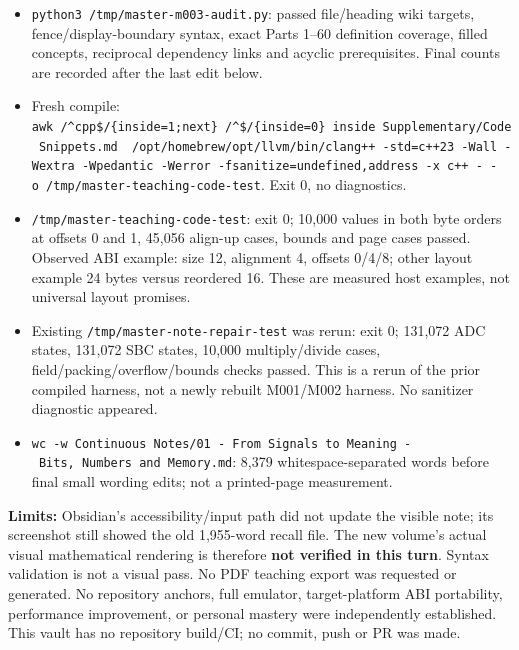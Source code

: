 \begin{itemize}
\tightlist
\item
  \texttt{python3\ /tmp/master-m003-audit.py}: passed file/heading wiki targets, fence/display-boundary syntax, exact Parts 1--60 definition coverage, filled concepts, reciprocal dependency links and acyclic prerequisites. Final counts are recorded after the last edit below.
\item
  Fresh compile: \texttt{awk\ \textquotesingle{}/\^{}\textasciigrave{}\textasciigrave{}\textasciigrave{}cpp\$/\{inside=1;next\}\ /\^{}\textasciigrave{}\textasciigrave{}\textasciigrave{}\$/\{inside=0\}\ inside\textquotesingle{}\ \textquotesingle{}Supplementary/Code\ Snippets.md\textquotesingle{}\ \textbar{}\ /opt/homebrew/opt/llvm/bin/clang++\ -std=c++23\ -Wall\ -Wextra\ -Wpedantic\ -Werror\ -fsanitize=undefined,address\ -x\ c++\ -\ -o\ /tmp/master-teaching-code-test}. Exit 0, no diagnostics.
\item
  \texttt{/tmp/master-teaching-code-test}: exit 0; 10,000 values in both byte orders at offsets 0 and 1, 45,056 align-up cases, bounds and page cases passed. Observed ABI example: size 12, alignment 4, offsets 0/4/8; other layout example 24 bytes versus reordered 16. These are measured host examples, not universal layout promises.
\item
  Existing \texttt{/tmp/master-note-repair-test} was rerun: exit 0; 131,072 ADC states, 131,072 SBC states, 10,000 multiply/divide cases, field/packing/overflow/bounds checks passed. This is a rerun of the prior compiled harness, not a newly rebuilt M001/M002 harness. No sanitizer diagnostic appeared.
\item
  \texttt{wc\ -w\ \textquotesingle{}Continuous\ Notes/01\ -\ From\ Signals\ to\ Meaning\ -\ Bits,\ Numbers\ and\ Memory.md\textquotesingle{}}: 8,379 whitespace-separated words before final small wording edits; not a printed-page measurement.
\end{itemize}

\textbf{Limits:} Obsidian's accessibility/input path did not update the visible note; its screenshot still showed the old 1,955-word recall file. The new volume's actual visual mathematical rendering is therefore \textbf{not verified in this turn}. Syntax validation is not a visual pass. No PDF teaching export was requested or generated. No repository anchors, full emulator, target-platform ABI portability, performance improvement, or personal mastery were independently established. This vault has no repository build/CI; no commit, push or PR was made.

